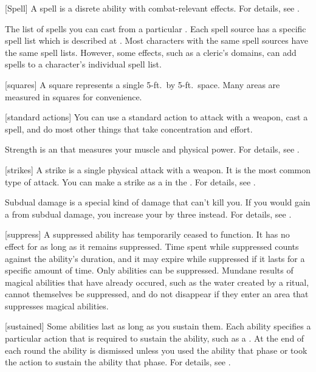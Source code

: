 [Spell] A spell is a disrete  ability with combat-relevant effects.
For details, see .

 The list of spells you can cast from a particular .
Each spell source has a specific spell list which is described at .
Most characters with the same spell sources have the same spell lists.
However, some effects, such as a cleric's domains, can add spells to a character's individual spell list.

[squares] A square represents a single 5-ft.\ by 5-ft.\ space.
Many areas are measured in squares for convenience.

[standard actions] You can use a standard action to attack with a weapon, cast a spell, and do most other things that take concentration and effort.

 Strength is an  that measures your muscle and physical power.
For details, see .

[strikes] A strike is a single physical attack with a weapon.
It is the most common type of attack.
You can make a strike as a  in the .
For details, see .

 Subdual damage is a special kind of damage that can't kill you.
If you would gain a  from subdual damage, you increase your  by three instead.
For details, see .

[suppress] A suppressed ability has temporarily ceased to function.
It has no effect for as long as it remains suppressed.
Time spent while suppressed counts against the ability's duration, and it may expire while suppressed if it lasts for a specific amount of time.
Only  abilities can be suppressed.
Mundane results of magical abilities that have already occured, such as the water created by a  ritual, cannot themselves be suppressed, and do not disappear if they enter an area that suppresses magical abilities.

[sustained] Some abilities last as long as you sustain them.
Each ability specifies a particular action that is required to sustain the ability, such as a .
At the end of each round the ability is dismissed unless you used the ability that phase or took the action to sustain the ability that phase.
For details, see .

